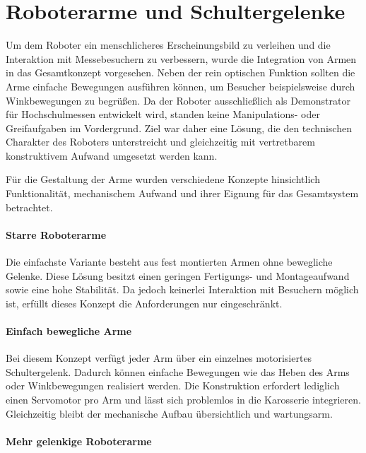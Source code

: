 
\section{Roboterarme und Schultergelenke}


Um dem Roboter ein  menschlicheres Erscheinungsbild zu verleihen und die Interaktion mit Messebesuchern zu verbessern, wurde die Integration von Armen in das Gesamtkonzept vorgesehen. Neben der rein optischen Funktion sollten die Arme einfache Bewegungen ausführen können, um Besucher beispielsweise durch Winkbewegungen zu begrüßen. Da der Roboter ausschließlich als Demonstrator für Hochschulmessen entwickelt wird, standen keine Manipulations- oder Greifaufgaben im Vordergrund. Ziel war daher eine Lösung, die den technischen Charakter des Roboters unterstreicht und gleichzeitig mit vertretbarem konstruktivem Aufwand umgesetzt werden kann.

Für die Gestaltung der Arme wurden verschiedene Konzepte hinsichtlich Funktionalität, mechanischem Aufwand und ihrer Eignung für das Gesamtsystem betrachtet.

\paragraph{Starre Roboterarme}

Die einfachste Variante besteht aus fest montierten Armen ohne bewegliche Gelenke. Diese Lösung besitzt einen geringen Fertigungs- und Montageaufwand sowie eine hohe Stabilität. Da jedoch keinerlei Interaktion mit Besuchern möglich ist, erfüllt dieses Konzept die Anforderungen nur eingeschränkt.

\paragraph{Einfach bewegliche Arme}

Bei diesem Konzept verfügt jeder Arm über ein einzelnes motorisiertes Schultergelenk. Dadurch können einfache Bewegungen wie das Heben des Arms oder Winkbewegungen realisiert werden. Die Konstruktion erfordert lediglich einen Servomotor pro Arm und lässt sich problemlos in die Karosserie integrieren. Gleichzeitig bleibt der mechanische Aufbau übersichtlich und wartungsarm.

\paragraph{Mehr gelenkige Roboterarme}

